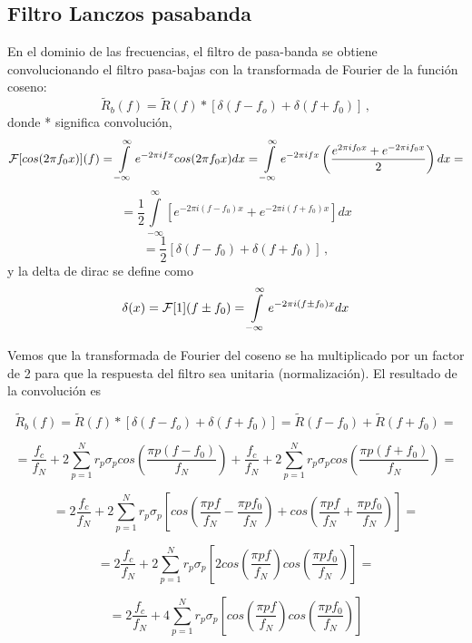 \documentclass[
]{agujournal2019}
\begin{document}
\subsection{Filtro Lanczos pasabanda}\label{filtro-lanczos-pasabanda}

En el dominio de las frecuencias, el filtro de pasa-banda se obtiene
convolucionando el filtro pasa-bajas con la transformada de Fourier de
la función coseno:
\[\widetilde{R}_b(f)=\widetilde{R}(f)*\left[\delta(f-f_o) + \delta(f+f_0) \right]\,,\]
donde * significa convolución,
\[{\cal F}[cos(2\pi f_0 x)](f)=\int\limits^{\infty}_{-\infty} e^{-2\pi i f x} cos(2\pi
f_0 x) dx=\int\limits^{\infty}_{-\infty} e^{-2\pi i f x}
\left(\frac{e^{2\pi i f_0 x} +e^{-2\pi i f_0 x}}{2}\right) dx = \]
\[=\frac{1}{2}\int\limits^{\infty}_{-\infty}\left[e^{-2\pi i (f-f_0) x} + e^{-2\pi i (f+f_0) x} \right] dx\]
\[=\frac{1}{2}\left[ \delta(f-f_0) + \delta(f+f_0)\right]\,,\] y la
delta de dirac se define como
\[\delta(x)={\cal F}[1](f\pm f_0)=\int\limits^{\infty}_{-\infty} e^{-2\pi i (f\pm f_0) x} dx\]

Vemos que la transformada de Fourier del coseno se ha multiplicado por
un factor de 2 para que la respuesta del filtro sea unitaria
(normalización). El resultado de la convolución es

\[\widetilde{R}_b(f)=\widetilde{R}(f)*\left[\delta(f-f_o) + \delta(f+f_0) \right]=
\widetilde{R}(f-f_0)+\widetilde{R}(f+f_0)=\]

\[=\frac{f_c}{f_N}+ 2\sum\limits^{N}_{p=1}
{r_p} \sigma_p cos\left( \frac{\pi p (f-f_0)}{f_N}\right) +
\frac{f_c}{f_N}+ 2\sum\limits^{N}_{p=1}
{r_p} \sigma_p cos\left( \frac{\pi p (f+f_0)}{f_N}\right)=\]

\[=2\frac{f_c}{f_N}+ 2\sum\limits^{N}_{p=1}
{r_p} \sigma_p \left[ cos\left( \frac{\pi p f}{f_N} - \frac{\pi p f_0}{f_N}\right) +
cos\left( \frac{\pi p f}{f_N} + \frac{\pi p f_0}{f_N}\right)\right]=\]

\[=2\frac{f_c}{f_N}+ 2\sum\limits^{N}_{p=1} r_p \sigma_p\left[
2cos\left( \frac{\pi p f}{f_N}\right) cos\left( \frac{\pi p f_0}{f_N}\right)\right]=\]

\[=2\frac{f_c}{f_N}+ 4\sum\limits^{N}_{p=1} r_p \sigma_p\left[
cos\left( \frac{\pi p f}{f_N}\right) cos\left( \frac{\pi p f_0}{f_N}\right)\right]\]

\begin{center}
\end{center}
\end{document}
